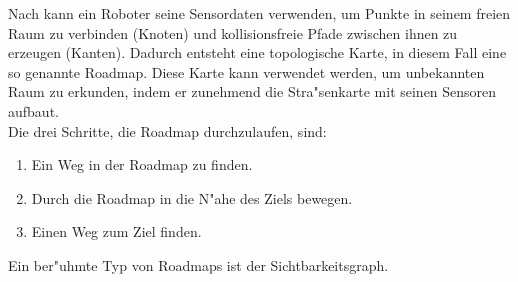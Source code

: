 %
Nach \cite{Principles:05} kann ein Roboter seine Sensordaten verwenden, um Punkte in seinem freien Raum zu verbinden (Knoten) und kollisionsfreie Pfade zwischen ihnen zu erzeugen (Kanten). Dadurch entsteht eine topologische Karte, in diesem Fall eine so genannte Roadmap. Diese Karte kann verwendet werden, um unbekannten Raum zu erkunden, indem er zunehmend die Stra{"s}enkarte mit seinen Sensoren aufbaut.\\
Die drei Schritte, die Roadmap durchzulaufen, sind: 
\begin{enumerate}
	\item Ein Weg in der Roadmap zu finden.
	\item Durch die Roadmap in die N"ahe des Ziels bewegen.
	\item Einen Weg zum Ziel finden.
\end{enumerate}
Ein ber"uhmte Typ von Roadmaps ist der Sichtbarkeitsgraph.


